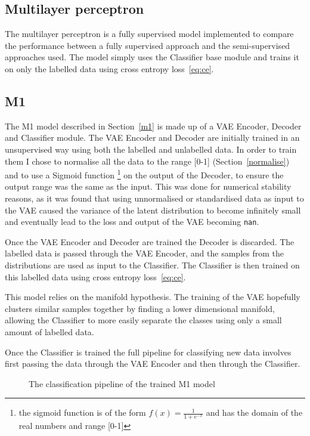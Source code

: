 \subsection{Multilayer perceptron}
The multilayer perceptron is a fully supervised model implemented to compare the performance between a fully supervised approach and the 
semi-supervised approaches used. The model simply uses the Classifier base module and trains it on only the labelled data
using cross entropy loss~\eqref{eq:ce}.

\subsection{M1}
The M1 model described in Section~\ref{m1} is made up of a VAE Encoder,
Decoder and Classifier 
module. The VAE Encoder and Decoder are initially trained in an unsupervised way using both the labelled and unlabelled data. In order 
to train them I chose to normalise all the data to the range [0-1] (Section~\ref{normalise}) and to use a Sigmoid function 
\footnote{the sigmoid function is of
the form $f(x) = \frac{1}{1+e^{-x}}$ and has the domain of the real numbers and range [0-1]} on the output of the Decoder, to ensure the output range 
was the same as the input. This was done for numerical stability reasons, as it was found that using unnormalised or standardised data 
as input to the VAE caused the variance of the latent distribution to become infinitely small and eventually lead to the loss and 
output of the VAE becoming \texttt{nan}.

Once the VAE Encoder and Decoder are trained the Decoder is discarded. The labelled data is passed through the VAE Encoder, and the samples
from the distributions are used as input to the Classifier. The Classifier is then trained on this labelled data using cross entropy 
loss~\eqref{eq:ce}. 

This model relies on the manifold hypothesis. The training of the VAE hopefully clusters similar samples together by finding a lower
dimensional manifold, allowing the Classifier to more easily separate the classes using only a small amount of labelled data.

Once the Classifier is trained the full pipeline for classifying new data involves first passing the data 
through the VAE Encoder and then through the Classifier.

\begin{figure}[H]
  \centering
  \caption{The classification pipeline of the trained M1 model}
\end{figure}

